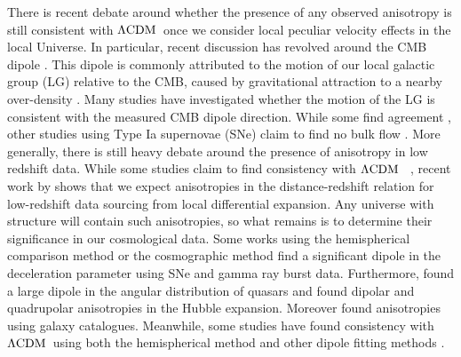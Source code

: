 \documentclass[fleqn,usenatbib]{mnras}
\newcommand{\lcdm}{$\Lambda\rm{CDM}$} %
\begin{document}
{ There is recent debate around whether the presence of any observed anisotropy is still consistent with \lcdm\ once %
{we consider local peculiar velocity} effects in the local Universe. %
{In particular, recent} discussion {has revolved} around the CMB dipole \citep{2018CMB, 2003WMAP.}. %
{This dipole is commonly} %
attributed to the motion of our local galactic group (LG) relative to the CMB, %
{caused by gravitational} attraction to a nearby over-density %
{\citep[see, e.g.][]{Nusser_Davis_2011}}. 
Many studies have investigated whether the motion of the LG is consistent with the {measured} CMB dipole direction. While some find %
agreement \citep[e.g.][]{Feindt2013, Appleby_2015}, other studies using Type Ia supernovae (SNe) claim to find no bulk flow \citep[e.g.][]{Huterer_2015}. 
More generally, there is still heavy debate around the presence of anisotropy in low redshift data. While some studies claim to find consistency with {\lcdm\ } %
\citep[e.g.][]{Gibelyou_2012, Alonso_2015, chang_2018}, recent %
{work by \citet{2022HAYLEY} shows that we expect anisotropies} %
in the distance-redshift relation for low-redshift data sourcing from local differential expansion. {Any universe with structure will contain such anisotropies, so what remains is to determine their significance in our cosmological data. } %
{Some works} using the hemispherical comparison method \citep{2016Bengaly, Cai_2012} %
{or} the %
cosmographic method 
\citep[][see also Section~\ref{sec:cosmo_distances}]{Sarkar2019, Wang_Wang_2014} find {a significant dipole} in the deceleration parameter using SNe and gamma ray burst data. Furthermore, \citet{Secrest_2021} found a large dipole in the angular distribution of quasars and \citet{Bolejko2016} found dipolar and quadrupolar anisotropies in the Hubble expansion. Moreover \citet{Rameez_2018, Kalbouneh:2022tfw} found anisotropies using galaxy catalogues. 
Meanwhile, %
{some studies have found consistency} 
with \lcdm\ using both the hemispherical method \citep{Kalus2013, zhao2019} 
{and other dipole fitting methods}
\citep[e.g.][]{Rubin_2020, Andrade2018, rahman2021new, soltis2019, Alonso_2015, Gibelyou_2012}.}
\end{document}
